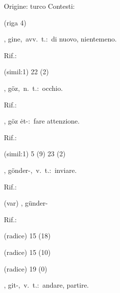 \begin{glossario}{Origine: turco}
Contesti:
\begin{subvocedue}
\item[(riga 4)] 
\end{subvocedue}
\item[{\color{colorlowref}\spzrl{gin.H}},] {\sf gine},\ avv.\ t.:\ di nuovo, nientemeno.
\begin{subvocedue}
\item[Rif.:] 
\end{subvocedue}
\begin{subvocedue}
\item[(simil:1)]   22 (2)
\end{subvocedue}
\item[{\color{colorlowref}\spzrl{g:Oz}},] {\sf göz},\ n.\ t.:\ occhio.
\begin{subvocedue}
\item[Rif.:] 
\end{subvocedue}
\begin{subvocedue}
\item[\subglossariobullet] , {\sf göz ėt-}:\ fare attenzione.
\begin{subvocedue}
\item[Rif.:] 
\end{subvocedue}
\item[(simil:1)]   5 (9) 23 (2)
\end{subvocedue}
\item[{\color{colorlowref}\spzrl{g:OnderB}},] {\sf gönder-},\ v.\ t.:\ inviare.
\begin{subvocedue}
\item[Rif.:] 
\end{subvocedue}
\begin{subvocedue}
\item[(var)] , {\sf günder-}\begin{subvocedue}
\item[Rif.:] 
\end{subvocedue}
\item[(radice)]   15 (18)
\item[(radice)]   15 (10)
\item[(radice)]   19 (0)
\end{subvocedue}
\item[{\color{colorlowref}\spzrl{g.IdB}},] {\sf git-},\ v.\ t.:\ andare, partire.

\end{glossario}
